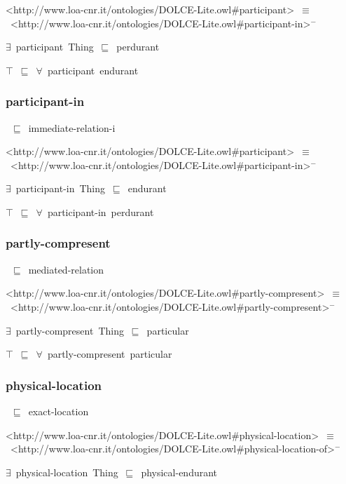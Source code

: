 \documentclass{article}
\begin{document}
<http://www.loa-cnr.it/ontologies/DOLCE-Lite.owl#participant>~\ensuremath{\equiv}~<http://www.loa-cnr.it/ontologies/DOLCE-Lite.owl#participant-in>\ensuremath{^-}

\ensuremath{\exists}~participant~Thing~\ensuremath{\sqsubseteq}~perdurant

\ensuremath{\top}~\ensuremath{\sqsubseteq}~\ensuremath{\forall}~participant~endurant

\subsubsection*{participant-in}

~\ensuremath{\sqsubseteq}~immediate-relation-i

<http://www.loa-cnr.it/ontologies/DOLCE-Lite.owl#participant>~\ensuremath{\equiv}~<http://www.loa-cnr.it/ontologies/DOLCE-Lite.owl#participant-in>\ensuremath{^-}

\ensuremath{\exists}~participant-in~Thing~\ensuremath{\sqsubseteq}~endurant

\ensuremath{\top}~\ensuremath{\sqsubseteq}~\ensuremath{\forall}~participant-in~perdurant

\subsubsection*{partly-compresent}

~\ensuremath{\sqsubseteq}~mediated-relation

<http://www.loa-cnr.it/ontologies/DOLCE-Lite.owl#partly-compresent>~\ensuremath{\equiv}~<http://www.loa-cnr.it/ontologies/DOLCE-Lite.owl#partly-compresent>\ensuremath{^-}

\ensuremath{\exists}~partly-compresent~Thing~\ensuremath{\sqsubseteq}~particular

\ensuremath{\top}~\ensuremath{\sqsubseteq}~\ensuremath{\forall}~partly-compresent~particular

\subsubsection*{physical-location}

~\ensuremath{\sqsubseteq}~exact-location

<http://www.loa-cnr.it/ontologies/DOLCE-Lite.owl#physical-location>~\ensuremath{\equiv}~<http://www.loa-cnr.it/ontologies/DOLCE-Lite.owl#physical-location-of>\ensuremath{^-}

\ensuremath{\exists}~physical-location~Thing~\ensuremath{\sqsubseteq}~physical-endurant
\end{document}
